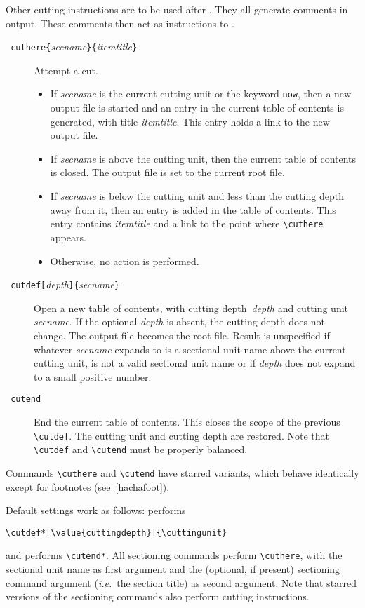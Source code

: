 Other cutting instructions are to be used after
\verb++. They all generate \html{} comments in \hevea{}
output.
These comments then act as instructions to {\hacha}.
\begin{description}
\item[{\tt{} cuthere\{}{\it secname}{\tt\}\{}{\it itemtitle}{\tt\}}]
   Attempt a cut.
   \begin{itemize}
   \item If {\it secname} is the current cutting  unit or
   the keyword \texttt{now}, then
   a new output file is started and an entry in the current table of contents
   is generated, with title {\it itemtitle}. This entry holds a link
   to the new output file.
   \item If {\it secname} is above the cutting  unit, then the
   current table of contents is closed. The output file is set to the
   current root file.
   \item If {\it secname} is below the cutting  unit and less than the
   cutting depth away from it, then an entry is added in the table of
   contents.
   This entry contains {\em itemtitle} and a link to the point where
   \verb+\cuthere+ appears.
   \item Otherwise, no action is performed.
   \end{itemize}

\item[{\tt{} cutdef[}{\it depth}{\tt]\{}{\it secname}{\tt \}}]
   Open a new table of contents, with cutting depth~{\em depth} and
   cutting unit {\em secname}. If the optional {\em depth} is absent,
   the cutting depth does not change.
   The output file becomes the root file.
   Result is unspecified if whatever {\em secname} expands to is
   a sectional unit name above
   the current cutting  unit, is not a valid sectional unit name or if
   {\em depth} does not expand to a small positive number.
\item[{\tt{} cutend}]
   End the current table of contents. This closes the scope of the
   previous \verb+\cutdef+. The cutting unit and cutting depth are
   restored.
   Note that \verb+\cutdef+ and \verb+\cutend+ must be properly balanced.
\end{description}
Commands \verb+\cuthere+ and \verb+\cutend+ have starred variants,
which behave identically except for footnotes (see~\ref{hachafoot}).

Default settings work as follows:
\verb++ performs
\begin{verbatim}
\cutdef*[\value{cuttingdepth}]{\cuttingunit}
\end{verbatim}
and \verb++ performs \verb+\cutend*+.
All sectioning commands perform \verb+\cuthere+,
with the sectional unit name as first argument and the (optional, if
present) sectioning
command argument (\emph{i.e.}\ the section title) as second argument.
Note that starred versions of the sectioning commands also perform
cutting instructions.

